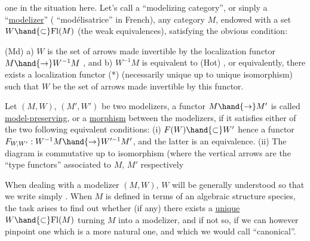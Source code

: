 one in the situation here. Let's call a ``modelizing category'', or sinply
a ``\uline{modelizer}'' ( ``modélisatrice'' in French), any category $M$, endowed with
a set $W\hand{\subset} \mathrm{Fl}(M)$ (the weak equivalences), satisfying the obvious condition:

(Md) a) $W$ is the set of arrows made invertible by the localization
functor $M\hand{\to} W^{-1}M$ , and
b) $W^{-1}M$ is equivalent to (Hot) ,
or equivalently, there exists a localization functor (*) (necessarily
unique up to unique isomorphism) such that $W$ be the set of arrows made
invertible by this functor.

Let $(M,W)$, $(M',W')$ be two modelizers, a functor  $M\hand{\to} M'$ is called
\uline{model-preserving}, or a \uline{morphism} between the modelizers, if it satisfies
either of the two following equivalent conditions:
(i) $F(W)\hand{\subset} W'$\hand{,} hence a functor $F_{W,W'} : W^{-1}M\hand{\to} W'^{-1}M'$, and the latter
is an equivalence.
(ii) The diagram
is commutative up to isomorphism (where the vertical arrows
are the  ``type functors'' associated to $M$, $M'$ respectively\hand{)}

When dealing with a modelizer $(M,W)$, $W$ will be generally understood
so that we write simply . When $M$ is defined in terms of an algebraic
structure species, the task arises to find out whether (if any) there
exists a \uline{unique} $W\hand{\subset} \mathrm{Fl}(M)$ turning $M$ into a modelizer, and if not so, if
we can however pinpoint one which is a more natural one, and which we
would call ``canonical''.

